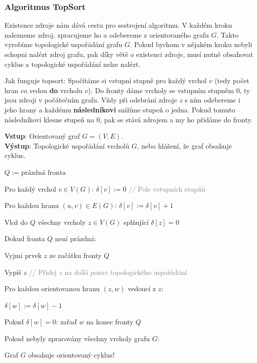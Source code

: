 \subsubsection{Algoritmus TopSort}

Existence zdroje nám dává cestu pro sestrojení algoritmu. V každém kroku nalezneme zdroj, zpracujeme ho a odebereme z orientovaného grafu $G$. Takto vyrobíme topologické uspořádání grafu $G$. Pokud bychom v nějakém kroku nebyli schopni nalézt zdroj grafu, pak díky větě o existenci zdroje, musí nutně obsahovat cyklus a topologické uspořádání nelze nalézt.\bigskip

\noindent Jak funguje topsort: Spočítáme si vstupní stupně pro každý vrchol $v$ (tedy počet hran co vedou \textbf{do} vrcholu $v$). Do fronty dáme vrcholy se vstupním stupněm 0, ty jsou zdroji v počátečním grafu. Vždy při odebrání zdroje $z$ s ním odebereme i jeho hrany a každému \textbf{následníkovi} snížíme stupeň o jedna. Pokud tomuto následníkovi klesne stupeň na 0, pak se stává zdrojem a my ho přidáme do fronty. \medskip

\noindent\textbf{Vstup}: Orientovaný graf $G = (V, E)$. \\
\noindent\textbf{Výstup}: Topologické uspořádání vrcholů $G$, nebo hlášení, že graf obsahuje cyklus. \\
\begin{pseudocode}
\item $Q := \text{prázdná fronta}$
\item Pro každý vrchol $v \in V(G)$: $\delta[v] := 0$ \textcolor{gray}{// Pole vstupních stupňů}
\item Pro každou hranu $(u, v) \in E(G)$: $\delta[v] := \delta[v] + 1$
\item Vlož do $Q$ všechny vrcholy $z \in V(G)$ splňující $\delta[z] = 0$
\item Dokud fronta $Q$ není prázdná:
\item \tab Vyjmi prvek $z$ ze začátku fronty $Q$
\item \tab Vypiš $z$ \textcolor{gray}{// Přidej $z$ na další pozici topologického uspořádání}
\item \tab Pro každou orientovanou hranu $(z, w)$ vedoucí z $z$:
\item \tab \tab $\delta[w] := \delta[w] - 1$
\item \tab \tab Pokud $\delta[w] = 0$: zařaď $w$ na konec fronty $Q$
\item Pokud nebyly zpracovány všechny vrcholy grafu $G$:
\item \tab Graf $G$ obsahuje orientovaný cyklus!
\end{pseudocode} 

